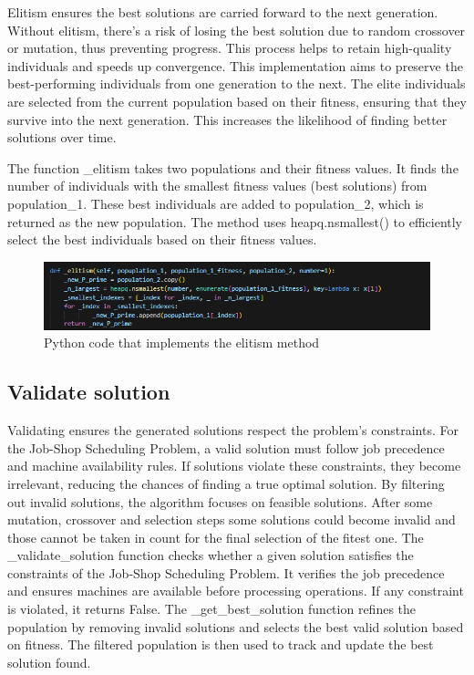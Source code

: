 \documentclass[11pt, a4paper]{article}
\begin{document}
Elitism ensures the best solutions are carried forward to the next generation. Without elitism, there’s a risk of losing the best solution due to random 
crossover or mutation, thus preventing progress. This process helps to retain high-quality individuals and speeds up convergence. This implementation aims to preserve the 
best-performing individuals from one generation to the next. The elite individuals are selected from the current population based on their fitness, ensuring that they survive 
into the next generation. This increases the likelihood of finding better solutions over time.

\newpage

The function \_elitism takes two populations and their fitness values. It finds the number of individuals with the smallest fitness values (best solutions) from population\_1. 
These best individuals are added to population\_2, which is returned as the new population. The method uses heapq.nsmallest() to efficiently select the best individuals based on 
their fitness values.

\begin{figure}[H]
    \centering
    \includegraphics[width=\textwidth]{media/elitism.png}
    \caption{Python code that implements the elitism method}
    \label{fig:image_11}
\end{figure}

\subsection{Validate solution}

Validating ensures the generated solutions respect the problem's constraints. For the Job-Shop Scheduling Problem, a valid solution must follow job precedence and machine 
availability rules. If solutions violate these constraints, they become irrelevant, reducing the chances of finding a true optimal solution. By filtering out invalid solutions, 
the algorithm focuses on feasible solutions. After some mutation, crossover and selection steps some solutions could become invalid and those cannot be taken in count for the 
final selection of the fitest one. The \_validate\_solution function checks whether a given solution satisfies the constraints of the Job-Shop Scheduling Problem. It verifies the job precedence and ensures 
machines are available before processing operations. If any constraint is violated, it returns False. The \_get\_best\_solution function refines the population by removing invalid 
solutions and selects the best valid solution based on fitness. The filtered population is then used to track and update the best solution found.
\end{document}
